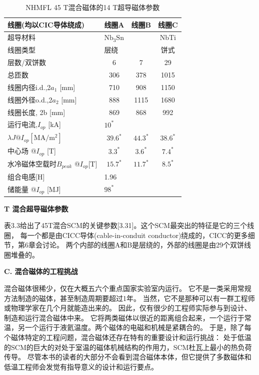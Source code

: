 \begin{table}[htbp]\small
\centering
\caption{NHMFL 45 T混合磁体的14 T超导磁体参数}
\begin{tabular}{|l|c|c|c|}
\hline
线圈(均以CIC导体绕成) & 线圈A & 线圈B & 线圈C \\ \hline
超导材料 & \multicolumn{2}{l|}{$\mathrm{Nb_3Sn}$} & NbTi \\ \hline
线圈类型 & \multicolumn{2}{l|}{层绕} & 饼式 \\ \hline
层数/双饼数 & 6 & 7 & 29 \\ \hline
总匝数 & 306 & 378 & 1015 \\ \hline
线圈内径i.d.,2$a_1$ {[}mm{]} & 710 & 908 & 1150 \\ 
线圈外径o.d.,2$a_2$ {[}mm{]} & 888 & 1115 & 1680 \\
线圈长度, 2b {[}mm{]} & 869 & 868 & 992 \\ \hline
运行电流,$I_{op}$ {[}kA{]} & \multicolumn{3}{l|}{$10^*$} \\ \hline
$\lambda J@I_{op} [\mathrm{MA/m^2}]$ & $39.6^*$ & $44.3^*$ & $38.6^*$ \\ \hline
中心场 @$I_{op}$ {[}T{]} & $3.3^*$ & $3.6^*$ & $7.4^*$ \\ \hline
水冷磁体空载时$B_{peak}$ @$I_{op}${[}T{]} & $15.7^*$ & $11.7^*$ & $8.5^*$ \\ \hline
组合电感{[}H{]} & \multicolumn{3}{l|}{1.96} \\ \hline
储能量 @$I_{op}$ {[}MJ{]} & \multicolumn{3}{l|}{$98^*$} \\ \hline

	\end{tabular}
\end{table}

\textbf{ T 混合超导磁体参数}

表3.3给出了45T混合SCM的关键参数[3.31]。这个SCM最突出的特征是它的三个线圈，
每一个都是由CICC导体(cable-in-conduit conductor)绕成的，CICC的更多细节，第6章会讨论。
两个内部的线圈A和B是层绕的，外部的线圈是由29个双饼线圈堆叠的。

\textbf{C. 混合磁体的工程挑战}

混合磁体很稀少，仅在大概五六个重点国家实验室内运行。
它不是一类采用常规方法制造的磁体，甚至制造周期要超过1年。
当然，它不是那种可以有一群工程师或物理学家在几个月就能造出来的。
因此，仅有很少的工程师实际参与到设计、制造和运行混合磁体中来。
它将两类磁体以很近的距离组合起来，一个运行于常温，另一个运行于液氦温度。两个磁体的电磁和机械是紧耦合的。
于是，除了每个磁体特定的工程问题，混合磁体还存在特有的重要设计和运行挑战：
处于低温的SCM的巨大的对处于室温的磁体机械结构的作用力，SCM杜瓦上最小的热负荷传导。
尽管本书的读者的大部分不会看到混合磁体本体，但它提供了多数磁体和低温工程师会发觉有指导意义的设计和运行要点。

